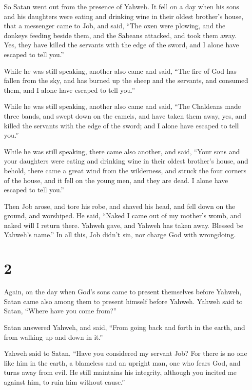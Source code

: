 So Satan went out from the presence of Yahweh.  It fell
on a day when his sons and his daughters were eating and drinking wine
in their oldest brother's house,  that a messenger came
to Job, and said, ``The oxen were plowing, and the donkeys feeding
beside them,  and the Sabeans attacked, and took them
away. Yes, they have killed the servants with the edge of the sword, and
I alone have escaped to tell you.''

 While he was still speaking, another also came and said,
``The fire of God has fallen from the sky, and has burned up the sheep
and the servants, and consumed them, and I alone have escaped to tell
you.''

 While he was still speaking, another also came and said,
``The Chaldeans made three bands, and swept down on the camels, and have
taken them away, yes, and killed the servants with the edge of the
sword; and I alone have escaped to tell you.''

 While he was still speaking, there came also another,
and said, ``Your sons and your daughters were eating and drinking wine
in their oldest brother's house,  and behold, there came
a great wind from the wilderness, and struck the four corners of the
house, and it fell on the young men, and they are dead. I alone have
escaped to tell you.''

 Then Job arose, and tore his robe, and shaved his head,
and fell down on the ground, and worshiped.  He said,
``Naked I came out of my mother's womb, and naked will I return there.
Yahweh gave, and Yahweh has taken away. Blessed be Yahweh's name.''
 In all this, Job didn't sin, nor charge God with
wrongdoing.

\hypertarget{section-1}{%
\section{2}\label{section-1}}

 Again, on the day when God's sons came to present
themselves before Yahweh, Satan came also among them to present himself
before Yahweh.  Yahweh said to Satan, ``Where have you
come from?''

Satan answered Yahweh, and said, ``From going back and forth in the
earth, and from walking up and down in it.''

 Yahweh said to Satan, ``Have you considered my servant
Job? For there is no one like him in the earth, a blameless and an
upright man, one who fears God, and turns away from evil. He still
maintains his integrity, although you incited me against him, to ruin
him without cause.''

